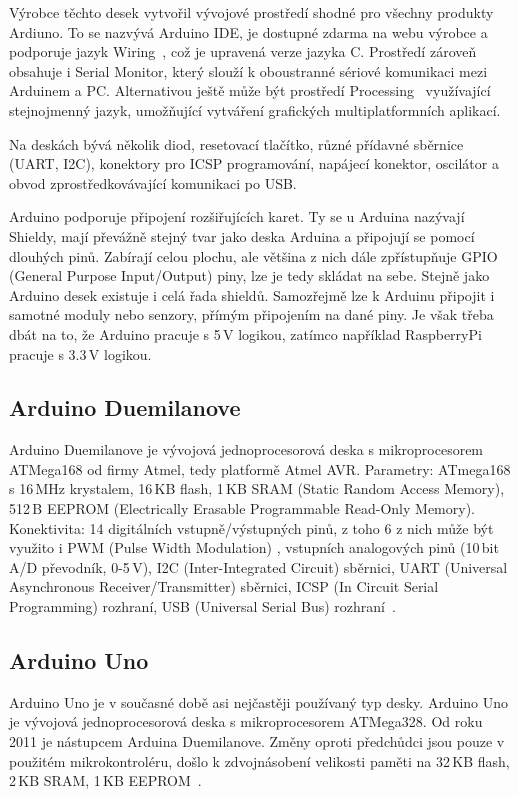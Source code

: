 Výrobce těchto desek vytvořil vývojové prostředí shodné pro všechny produkty Ardiuno. To se nazvývá Arduino IDE, je dostupné zdarma na webu výrobce a podporuje jazyk Wiring~\cite{embed_about_wiring_2011}, což je upravená verze jazyka C. Prostředí zároveň obsahuje i Serial Monitor, který slouží k oboustranné sériové komunikaci mezi Arduinem a PC. Alternativou ještě může být prostředí Processing~\cite{embed_about_processing_2015} využívající stejnojmenný jazyk, umožňující vytváření grafických multiplatformních aplikací.
	
Na deskách bývá několik diod, resetovací tlačítko, různé přídavné sběrnice (UART, I2C), konektory pro ICSP programování, napájecí konektor, oscilátor a obvod zprostředkovávající komunikaci po USB.
	
Arduino podporuje připojení rozšiřujících karet. Ty se u Arduina nazývají Shieldy, mají převážně stejný tvar jako deska Arduina a připojují se pomocí dlouhých pinů. Zabírají celou plochu, ale většina z nich dále zpřístupňuje GPIO (General Purpose Input/Output) piny, lze je tedy skládat na sebe. Stejně jako Arduino desek existuje i celá řada shieldů. Samozřejmě lze k Arduinu připojit i samotné moduly nebo senzory, přímým připojením na dané piny. Je však třeba dbát na to, že Arduino pracuje s 5\,V logikou, zatímco například RaspberryPi pracuje s 3.3\,V logikou.
	
		\subsection{Arduino Duemilanove} Arduino Duemilanove je vývojová jednoprocesorová deska s mikroprocesorem ATMega168 od firmy Atmel, tedy platformě Atmel AVR. 
		Parametry: ATmega168 s 16\,MHz krystalem, 16\,KB flash, 1\,KB SRAM (Static Random Access Memory), 512\,B EEPROM (Electrically Erasable Programmable Read-Only Memory). 	Konektivita: 14 digitálních vstupně/výstupných pinů, z toho 6 z nich může být využito i PWM (Pulse Width Modulation) , vstupních analogových pinů (10\,bit A/D převodník, 0-5\,V), I2C (Inter-Integrated Circuit) sběrnici, UART (Universal Asynchronous Receiver/Transmitter) sběrnici, ICSP (In Circuit Serial Programming) rozhraní, USB (Universal Serial Bus) rozhraní~\cite{ArduinoDuemilanove}.	
	
		\subsection{Arduino Uno} Arduino Uno je v současné době asi nejčastěji používaný typ desky. Arduino Uno je vývojová jednoprocesorová deska s mikroprocesorem ATMega328. Od roku 2011 je nástupcem Arduina Duemilanove. Změny oproti předchůdci jsou pouze v použitém mikrokontroléru, došlo k zdvojnásobení velikosti paměti na 32\,KB flash, 2\,KB SRAM, 1\,KB EEPROM~\cite{ArduinoUno}.
	
